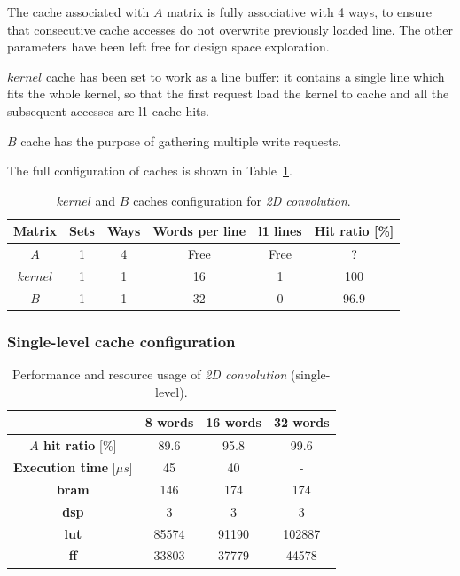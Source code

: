 \documentclass[11pt,a4paper,oneside]{memoir}
\begin{document}
The cache associated with $A$ matrix is fully associative with 4 ways, to ensure
that consecutive cache accesses do not overwrite previously loaded line.
The other parameters have been left free for design space exploration.

$kernel$ cache has been set to work as a line buffer: it contains a single line
which fits the whole kernel, so that the first request load the kernel to cache
and all the subsequent accesses are \ac{l1} cache hits.

$B$ cache has the purpose of gathering multiple write requests.

The full configuration of caches is shown in Table~\ref{tab:conv_cache_config}.

\begin{table}[H]
	\begin{center}
		\begin{tabular}{cccccc}
			\hline
			\rowcolor{gray!50}
			\textbf{Matrix} & \textbf{Sets} & \textbf{Ways} &
			\textbf{Words per line} & \textbf{\ac{l1} lines} &
			\textbf{Hit ratio} [\%] \\
			\hline
			$A$ & 1 & 4 & Free & Free & ? \\
			\rowcolor{gray!25}
			$kernel$ & 1 & 1 & 16 & 1 & 100 \\
			$B$ & 1 & 1 & 32 & 0 & 96.9 \\
			\hline
		\end{tabular}
	\end{center}
	\caption{$kernel$ and $B$ caches configuration for \emph{2D convolution}.}
	\label{tab:conv_cache_config}
\end{table}

\subsubsection{Single-level cache configuration}
\begin{table}[H]
	\begin{center}
		\begin{tabular}{cccc}
			\hline
			\rowcolor{gray!50}
			& \textbf{8 words} & \textbf{16 words} & \textbf{32 words} \\
			\hline
			\textbf{$A$ hit ratio} [\%] & 89.6 & 95.8 & 99.6 \\
			\rowcolor{gray!25}
			\textbf{Execution time} [$\mu s$] & 45 & 40 & - \\
			\textbf{\ac{bram}} & 146 & 174 & 174 \\
			\rowcolor{gray!25}
			\textbf{\ac{dsp}} & 3 & 3 & 3 \\
			\textbf{\acs{lut}} & 85574 & 91190 & 102887 \\
			\rowcolor{gray!25}
			\textbf{\acs{ff}} & 33803 & 37779 & 44578 \\
			\hline
		\end{tabular}
	\end{center}
	\caption{Performance and resource usage of \emph{2D convolution}
	(single-level).}
	\label{tab:conv_no_l1_report}
\end{table}
\end{document}

